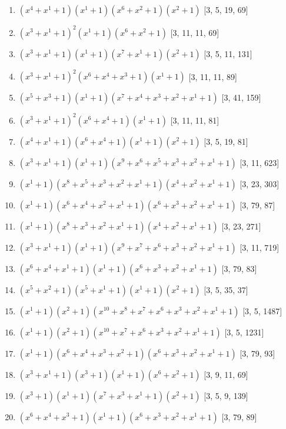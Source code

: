 \documentclass[10pt,twocolumn]{article}
\begin{document}
\begin{enumerate}
\item $(x^{4} + x^{1} + 1)(x^{1} + 1)(x^{6} + x^{2} + 1)(x^{2} + 1)$  [3, 5, 19, 69]
\item $(x^{3} + x^{1} + 1)^{2}(x^{1} + 1)(x^{6} + x^{2} + 1)$  [3, 11, 11, 69]
\item $(x^{3} + x^{1} + 1)(x^{1} + 1)(x^{7} + x^{1} + 1)(x^{2} + 1)$  [3, 5, 11, 131]
\item $(x^{3} + x^{1} + 1)^{2}(x^{6} + x^{4} + x^{3} + 1)(x^{1} + 1)$  [3, 11, 11, 89]
\item $(x^{5} + x^{3} + 1)(x^{1} + 1)(x^{7} + x^{4} + x^{3} + x^{2} + x^{1} + 1)$  [3, 41, 159]
\item $(x^{3} + x^{1} + 1)^{2}(x^{6} + x^{4} + 1)(x^{1} + 1)$  [3, 11, 11, 81]
\item $(x^{4} + x^{1} + 1)(x^{6} + x^{4} + 1)(x^{1} + 1)(x^{2} + 1)$  [3, 5, 19, 81]
\item $(x^{3} + x^{1} + 1)(x^{1} + 1)(x^{9} + x^{6} + x^{5} + x^{3} + x^{2} + x^{1} + 1)$  [3, 11, 623]
\item $(x^{1} + 1)(x^{8} + x^{5} + x^{3} + x^{2} + x^{1} + 1)(x^{4} + x^{2} + x^{1} + 1)$  [3, 23, 303]
\item $(x^{1} + 1)(x^{6} + x^{4} + x^{2} + x^{1} + 1)(x^{6} + x^{3} + x^{2} + x^{1} + 1)$  [3, 79, 87]
\item $(x^{1} + 1)(x^{8} + x^{3} + x^{2} + x^{1} + 1)(x^{4} + x^{2} + x^{1} + 1)$  [3, 23, 271]
\item $(x^{3} + x^{1} + 1)(x^{1} + 1)(x^{9} + x^{7} + x^{6} + x^{3} + x^{2} + x^{1} + 1)$  [3, 11, 719]
\item $(x^{6} + x^{4} + x^{1} + 1)(x^{1} + 1)(x^{6} + x^{3} + x^{2} + x^{1} + 1)$  [3, 79, 83]
\item $(x^{5} + x^{2} + 1)(x^{5} + x^{1} + 1)(x^{1} + 1)(x^{2} + 1)$  [3, 5, 35, 37]
\item $(x^{1} + 1)(x^{2} + 1)(x^{10} + x^{8} + x^{7} + x^{6} + x^{3} + x^{2} + x^{1} + 1)$  [3, 5, 1487]
\item $(x^{1} + 1)(x^{2} + 1)(x^{10} + x^{7} + x^{6} + x^{3} + x^{2} + x^{1} + 1)$  [3, 5, 1231]
\item $(x^{1} + 1)(x^{6} + x^{4} + x^{3} + x^{2} + 1)(x^{6} + x^{3} + x^{2} + x^{1} + 1)$  [3, 79, 93]
\item $(x^{3} + x^{1} + 1)(x^{3} + 1)(x^{1} + 1)(x^{6} + x^{2} + 1)$  [3, 9, 11, 69]
\item $(x^{3} + 1)(x^{1} + 1)(x^{7} + x^{3} + x^{1} + 1)(x^{2} + 1)$  [3, 5, 9, 139]
\item $(x^{6} + x^{4} + x^{3} + 1)(x^{1} + 1)(x^{6} + x^{3} + x^{2} + x^{1} + 1)$  [3, 79, 89]

\end{enumerate}
\end{document}
